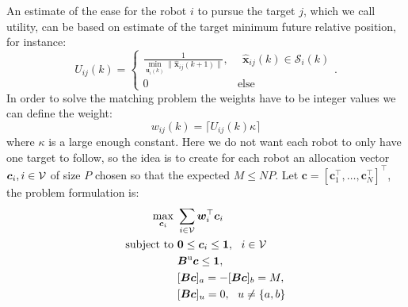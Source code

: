 \documentclass[11pt,draftclsnofoot,onecolumn]{IEEEtran}
\begin{document}
An estimate of the ease for the robot $i$ to pursue the target $j$, which we call utility, can be based on estimate of the target minimum future relative position, for instance: 
\begin{equation}
    U_{ij}(k) = 
    \begin{cases}
        \frac{1}{\min_{\bm u_i(k)} \|\hat{\bm x}_{ij}(k+1)\|},&~~\hat{\bm x}_{ij}(k)\in \mathcal{S}_i(k)\\
        0 &\mbox{else}
    \end{cases}. 
\end{equation}
In order to solve the matching problem the weights have to be integer values we can define the weight:
\begin{equation}
    w_{ij}(k)=\lceil U_{ij}(k) \kappa\rceil
\end{equation}
where $\kappa$ is a large enough constant. 
Here we do not want each robot to only have one target to follow, so the idea is to create for each robot an allocation vector $\bm c_i, i\in {\cal V}$ of size $P$ chosen so that the expected $M\leq NP$. Let $\bm c=[\bm c_1^\top,\ldots,\bm c_N^\top]^\top$,  the problem formulation is:
\begin{align}
\max_{\bm c_i} &~\sum_{i\in {\cal V}}\bm w_i^\top \bm c_i\\
\mbox{subject to}&~\bm 0\leq \bm c_i\leq \bm 1,~~ i\in {\cal V}\\ 
&~\bm B^{\text{u}}\bm c\leq \bm 1,\\  
    &~[\bm B\bm c]_a=-[\bm B\bm c]_b=M,\\
      &~[\bm B\bm c]_u=0,~~u\neq \{a,b\}  
\end{align}




% 
% 
\end{document}
